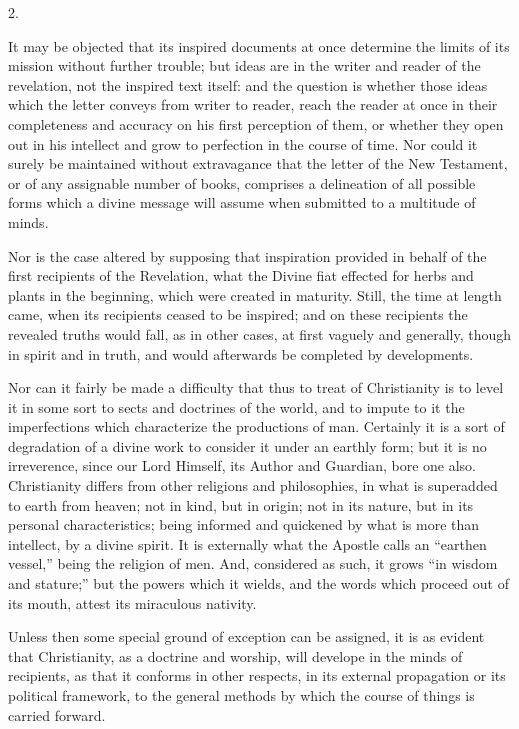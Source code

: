 2.

It may be objected that its inspired documents at once
determine the limits of its mission without further
trouble; but ideas are in the writer and reader of the
revelation, not the inspired text itself: and the
question is whether those ideas which the letter conveys
from writer to reader, reach the reader at once in their
completeness and accuracy on his first perception of
them, or whether they open out in his intellect and grow
to perfection in the course of time. Nor could it surely
be maintained without extravagance that the letter of the
New Testament, or of any assignable number of books,
comprises a delineation of all possible forms which a
divine message will assume when submitted to a multitude
of minds.

Nor is the case altered by supposing that inspiration
provided in behalf of the first recipients of the
Revelation, what the Divine fiat effected for herbs and
plants in the beginning, which were created in maturity.
Still, the time at length came, when its recipients
ceased to be inspired; and on these recipients the
revealed truths would fall, as in other cases, at first
vaguely and generally, though in spirit and in truth, and
would afterwards be completed by developments.

Nor can it fairly be made a difficulty that thus to
treat of Christianity is to level it in some sort to
sects and doctrines of the world, and to impute to it the
imperfections which characterize the productions of man.
Certainly it is a sort of degradation of a divine work to
consider it under an earthly form; but it is no
irreverence, since our Lord Himself, its Author and
Guardian, bore one also. Christianity differs from other
religions and philosophies, in what is superadded to
earth from heaven; not in kind, but in origin; not in its
nature, but in its personal characteristics; being
informed and quickened by what is more than intellect, by
a divine spirit. It is externally what the Apostle calls
an ``earthen vessel,'' being the religion of men.
And, considered as such, it grows ``in wisdom and
stature;'' but the powers which it wields, and the
words which proceed out of its mouth, attest its
miraculous nativity.

Unless then some special ground of exception can be
assigned, it is as evident that Christianity, as a
doctrine and worship, will develope in the minds of
recipients, as that it conforms in other respects, in its
external propagation or its political framework, to the
general methods by which the course of things is carried
forward.

